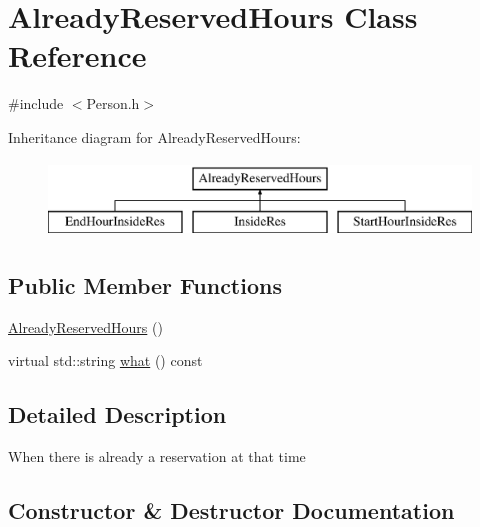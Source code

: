 \hypertarget{class_already_reserved_hours}{}\section{Already\+Reserved\+Hours Class Reference}
\label{class_already_reserved_hours}


{\ttfamily \#include $<$Person.\+h$>$}

Inheritance diagram for Already\+Reserved\+Hours\+:\begin{figure}[H]
\begin{center}
\leavevmode
\includegraphics[height=2.000000cm]{class_already_reserved_hours}
\end{center}
\end{figure}
\subsection*{Public Member Functions}
\begin{DoxyCompactItemize}
\item 
\mbox{\hyperlink{class_already_reserved_hours_a3602604e7295f0a54eb68079c3b2917b}{Already\+Reserved\+Hours}} ()
\item 
virtual std\+::string \mbox{\hyperlink{class_already_reserved_hours_a69081ef7e75aa68b9aa5c75d02fe2194}{what}} () const
\end{DoxyCompactItemize}


\subsection{Detailed Description}
When there is already a reservation at that time 

\subsection{Constructor \& Destructor Documentation}
\mbox{\label{class_already_reserved_hours_a3602604e7295f0a54eb68079c3b2917b}} 
